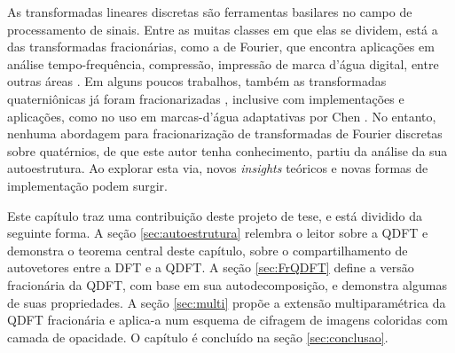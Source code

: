 As transformadas lineares discretas s\~ao ferramentas basilares no campo de processamento de sinais. Entre as muitas classes em que elas se dividem, est\'a a das transformadas fracion\'arias, como a de Fourier, que encontra aplica\c c\~oes em an\'alise tempo-frequ\^encia, compress\~ao, impress\~ao de marca d'\'agua digital, entre outras \'areas \cite{bultheel2002shattered}. Em alguns poucos trabalhos, tamb\'em as transformadas quaterni\^onicas j\'a foram fracionarizadas
\cite{guanlei2008fractional, wei2013different, roopkumar2016quaternionic}, inclusive com implementa\c c\~oes e aplica\c c\~oes, como no uso em marcas-d'\'agua adaptativas por Chen
\cite{chen2018quaternion}. No entanto, nenhuma abordagem para fracionariza\c c\~ao de transformadas de Fourier discretas sobre quat\'ernios, de que este autor tenha conhecimento, partiu da an\'alise da sua autoestrutura. Ao explorar esta via, novos \textit{insights} te\'oricos e novas formas de implementa\c c\~ao podem surgir.

Este cap\'itulo traz uma contribui\c c\~ao deste projeto de tese, e est\'a dividido da seguinte forma.
A se\c c\~ao \ref{sec:autoestrutura} relembra o leitor sobre a QDFT e demonstra o teorema central deste cap\'itulo, sobre o compartilhamento de autovetores entre a DFT e a QDFT. A se\c c\~ao \ref{sec:FrQDFT} define a vers\~ao fracion\'aria da QDFT, com base em sua autodecomposi\c c\~ao, e demonstra algumas de suas propriedades. A se\c c\~ao \ref{sec:multi} prop\~oe a extens\~ao multiparam\'etrica da QDFT fracion\'aria e aplica-a num esquema de cifragem de imagens coloridas com camada de opacidade. O cap\'itulo \'e conclu\'ido na se\c c\~ao \ref{sec:conclusao}.




